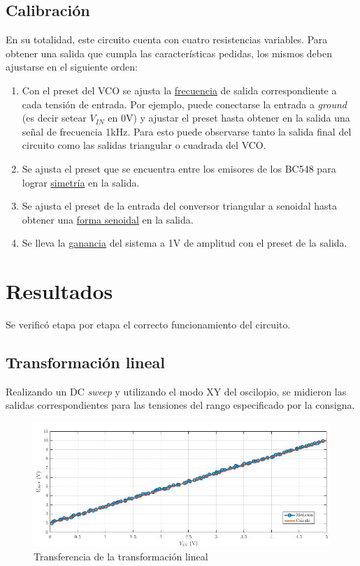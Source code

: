 \documentclass[../../tc_tp6_main.tex]{subfiles}
\begin{document}
\subsection{Calibraci\'on} \label{ssection:cal}


En su totalidad, este circuito cuenta con cuatro resistencias variables. Para obtener una salida que cumpla las caracter\'isticas pedidas, los mismos deben ajustarse en el siguiente orden:

\begin{enumerate}
	\item Con el preset del VCO se ajusta la \underline{frecuencia} de salida correspondiente a cada tensi\'on de entrada. Por ejemplo, puede conectarse la entrada a \textit{ground} (es decir setear $V_{IN}$ en 0V) y ajustar el preset hasta obtener en la salida una se\~nal de frecuencia 1kHz. Para esto puede observarse tanto la salida final del circuito como las salidas triangular o cuadrada del VCO.
	\item Se ajusta el preset que se encuentra entre los emisores de los BC548 para lograr \underline{simetr\'ia} en la salida.
	\item Se ajusta el preset de la entrada del conversor triangular a senoidal hasta obtener una \underline{forma senoidal} en la salida.
	\item Se lleva la \underline{ganancia} del sistema a 1V de amplitud con el preset de la salida. 
\end{enumerate}

\newpage

\section{Resultados}

Se verific\'o etapa por etapa el correcto funcionamiento del circuito.

\subsection{Transformaci\'on lineal}

Realizando un DC \textit{sweep} y utilizando el modo XY del oscilopio, se midieron las salidas correspondientes para las tensiones del rango especificado por la consigna.

\begin{figure}[H]
	\centering
	\includegraphics[scale=0.71]{imagenes/tc_tp6_ej3_tl.jpg}
	\caption{Transferencia de la transformaci\'on lineal}
\end{figure}
\end{document}
